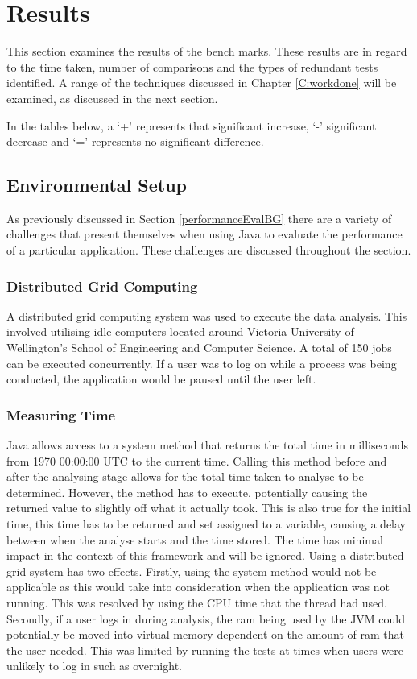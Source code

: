 \chapter{Results}\label{C:results}

This section examines the results of the bench marks. These results are in regard to the time taken, number of comparisons and the types of redundant tests identified. A range of the techniques discussed in Chapter \ref{C:workdone} will be examined, as discussed in the next section. 

In the tables below, a `+' represents that significant increase, `-' significant decrease and `=' represents no significant difference.

\section{Environmental Setup}

As previously discussed in Section \ref{performanceEvalBG} there are a variety of challenges that present themselves when using Java to evaluate the performance of a particular application. These challenges are discussed throughout the section.

\subsection{Distributed Grid Computing}
 A distributed grid computing system was used to execute the data analysis. This involved utilising idle computers located around Victoria University of Wellington's School of Engineering and Computer Science. A total of 150 jobs can be executed concurrently. If a user was to log on while a process was being conducted, the application would be paused until the user left.

\subsection{Measuring Time}
Java allows access to a system method that returns the total time in milliseconds from 1970 00:00:00 UTC to the current time. Calling this method before and after the analysing stage allows for the total time taken to analyse to be determined. However, the method has to execute, potentially causing the returned value to slightly off what it actually took. This is also true for the initial time, this time has to be returned and set assigned to a variable, causing a delay between when the analyse starts and the time stored. The time has minimal impact in the context of this framework and will be ignored. Using a distributed grid system has two effects. Firstly, using the system method would not be applicable as this would take into consideration when the application was not running. This was resolved by using the CPU time that the thread had used. Secondly, if a user logs in during analysis, the ram being used by the JVM could potentially be moved into virtual memory dependent on the amount of ram that the user needed. This was limited by running the tests at times when users were unlikely to log in such as overnight.


